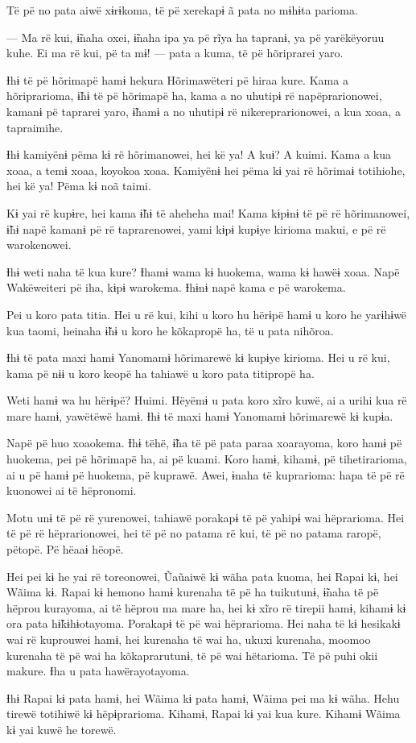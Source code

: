 Të pë no pata aiwë xɨrɨkoma, të pë xerekapɨ ã pata no mɨhɨta parioma. 

— Ma rë kui, ɨ̃naha oxei, ɨ̃naha ipa ya pë rĩya ha tapranɨ, ya pë
yarëkëyoruu kuhe. Ei ma rë kui, pë ta mɨ! --- pata a kuma, të pë
hõriprarei yaro. 

Ɨhɨ të pë hõrimapë hamɨ hekura Hõrimawëteri pë hiraa kure. Kama a
hõriprarioma, ɨ̃hɨ të pë hõrimapë ha, kama a no uhutipɨ rë
napëprarionowei, kamanɨ pë taprarei yaro, ɨ̃hamɨ a no uhutipɨ rë
nikereprarionowei, a kua xoaa, a tapraimihe. 

Ɨhɨ kamiyënɨ pëma kɨ rë hõrimanowei, hei kë ya! A kuɨ? A kuimi. Kama a
kua xoaa, a temɨ xoaa, koyokoa xoaa. Kamiyënɨ hei pëma kɨ yai rë hõrimaɨ
totihiohe, hei kë ya! Pëma kɨ noã taimi. 

Kɨ yai rë kupɨre, hei kama ɨ̃hɨ të aheheha mai! Kama kɨpɨnɨ të pë rë
hõrimanowei, ɨ̃hɨ napë kamanɨ pë rë taprarenowei, yami kɨpɨ kupɨye
kirioma makui, e pë rë warokenowei. 

Ɨhɨ weti naha të kua kure? Ɨhamɨ wama kɨ huokema, wama kɨ hawëɨ xoaa.
Napë Wakëweiteri pë iha, kɨpɨ warokema. Ɨhɨnɨ napë kama e pë warokema. 

Pei u koro pata titia. Hei u rë kui, kihi u koro hu hërɨpë hamɨ u koro
he yarɨhɨwë kua taomi, heinaha ɨ̃hɨ u koro he kõkapropë ha, të u pata
nihõroa. 

Ɨhɨ të pata maxi hamɨ Yanomamɨ hõrimarewë kɨ kupɨye kirioma. Hei u rë
kui, kama pë nɨɨ u koro keopë ha tahiawë u koro pata titipropë ha. 

Weti hamɨ wa hu hërɨpë? Huimi. Hëyëmɨ u pata koro xĩro kuwë, ai a urihi
kua rë mare hamɨ, yawëtëwë hamɨ. Ɨhɨ të maxi hamɨ Yanomamɨ hõrimarewë kɨ
kupɨa. 

Napë pë huo xoaokema. Ɨhɨ tëhë, ɨ̃ha të pë pata paraa xoarayoma, koro
hamɨ pë huokema, pei pë hõrimapë ha, ai pë kuami. Koro hamɨ, kihamɨ, pë
tihetirarioma, ai u pë hamɨ pë huokema, pë kuprawë. Awei, ɨnaha të
kuprarioma: hapa të pë rë kuonowei ai të hëpronomi. 

Motu unɨ të pë rë yurenowei, tahiawë porakapɨ të pë yahipɨ wai
hëprarioma. Hei të pë rë hëprarionowei, hei të pë no patama rë kui, të
pë no patama raropë, pëtopë. Pë hëaaɨ hëopë. 

Hei pei kɨ he yai rë toreonowei, Ũaũaiwë kɨ wãha pata kuoma, hei Rapai
kɨ, hei Wãima kɨ. Rapai kɨ hemono hamɨ kurenaha të pë ha tuikutunɨ,
ɨ̃naha të pë hëprou kurayoma, ai të hëprou ma mare ha, hei kɨ xĩro rë
tirepii hamɨ, kihamɨ kɨ ora pata hɨ̃kɨhɨotayoma. Porakapɨ të pë wai
hëprarioma. Hei naha të kɨ hesikakɨ wai rë kuprouwei hamɨ, hei kurenaha
të wai ha, ukuxi kurenaha, moomoo kurenaha të pë wai ha kõkaprarutunɨ,
të pë wai hëtarioma. Të pë puhi okii makure. Ɨha u pata hawërayotayoma.

 

 

Ɨhɨ Rapai kɨ pata hamɨ, hei Wãima kɨ pata hamɨ, Wãima pei ma kɨ wãha.
Hehu tirewë totihiwë kɨ hëpɨprarioma. Kihamɨ, Rapai kɨ yai kua kure.
Kihamɨ Wãima kɨ yai kuwë he torewë. 

 
